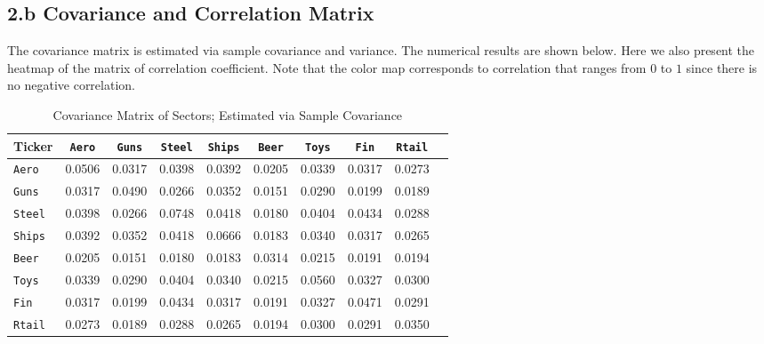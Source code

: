 \documentclass[10 pt]{hwtemplate} %
\begin{document}
\subsection*{2.b Covariance and Correlation Matrix}
The covariance matrix is estimated via sample covariance and variance. The numerical results are shown below. Here we also present the heatmap of the matrix of correlation coefficient. Note that the color map corresponds to correlation that ranges from $0$ to $1$ since there is no negative correlation.
\begin{table}[htbp]
  \begin{center}
  \captionsetup{justification=centering}
  \caption{\label{tab:mean}Covariance Matrix of Sectors; Estimated via Sample Covariance}
  \small
    \begin{tabular}{lccccccccc}
    \toprule
      Ticker & \texttt{Aero} & \texttt{Guns} & \texttt{Steel}& \texttt{Ships}& \texttt{Beer}& \texttt{Toys}& \texttt{Fin}&  \texttt{Rtail}\\
      \midrule
      \texttt{Aero}&0.0506 & 0.0317 & 0.0398 & 0.0392 & 0.0205 & 0.0339 & 0.0317 & 0.0273 \\
      \texttt{Guns}&0.0317 & 0.0490 & 0.0266 & 0.0352 & 0.0151 & 0.0290 & 0.0199 & 0.0189 \\
      \texttt{Steel}&0.0398 & 0.0266 & 0.0748 & 0.0418 & 0.0180 & 0.0404 & 0.0434 & 0.0288 \\
      \texttt{Ships}&0.0392 & 0.0352 & 0.0418 & 0.0666 & 0.0183 & 0.0340 & 0.0317 & 0.0265 \\
      \texttt{Beer}&0.0205 & 0.0151 & 0.0180 & 0.0183 & 0.0314 & 0.0215 & 0.0191 & 0.0194 \\
      \texttt{Toys}&0.0339 & 0.0290 & 0.0404 & 0.0340 & 0.0215 & 0.0560 & 0.0327 & 0.0300 \\
      \texttt{Fin}&0.0317 & 0.0199 & 0.0434 & 0.0317 & 0.0191 & 0.0327 & 0.0471 & 0.0291 \\
      \texttt{Rtail}&0.0273 & 0.0189 & 0.0288 & 0.0265 & 0.0194 & 0.0300 & 0.0291 & 0.0350 \\
    \bottomrule
    \end{tabular}
  \end{center}
\end{table}
\end{document}

